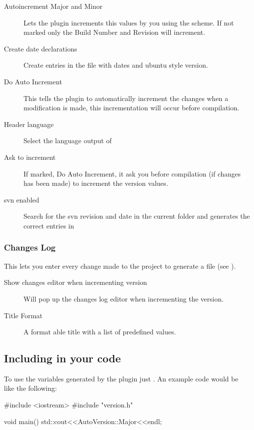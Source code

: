 \begin{description}
\item[Autoincrement Major and Minor] Lets the plugin increments this values by you using the scheme. If not marked only the Build Number and Revision will increment.
\item[Create date declarations] Create entries in the  file with dates and ubuntu style version.
\item[Do Auto Increment] This tells the plugin to automatically increment the changes when a modification is made, this incrementation will occur before compilation.
\item[Header language] Select the language output of 
\item[Ask to increment] If marked, Do Auto Increment, it ask you before compilation (if changes has been made) to increment the version values.
\item[svn enabled] Search for the svn revision and date in the current folder and generates the correct entries in 
\end{description}

\subsubsection{Changes Log}

This lets you enter every change made to the project to generate a  file (see ).


\begin{description}
\item[Show changes editor when incrementing version] Will pop up the changes log editor when incrementing the version.
\item[Title Format] A format able title with a list of predefined values.
\end{description}

\subsection{Including in your code}

To use the variables generated by the plugin just . An example code would be like the following:

\begin{code}
#include <iostream>
#include "version.h"

void main(){
    std::cout<<AutoVersion::Major<<endl;
}
\end{code}

